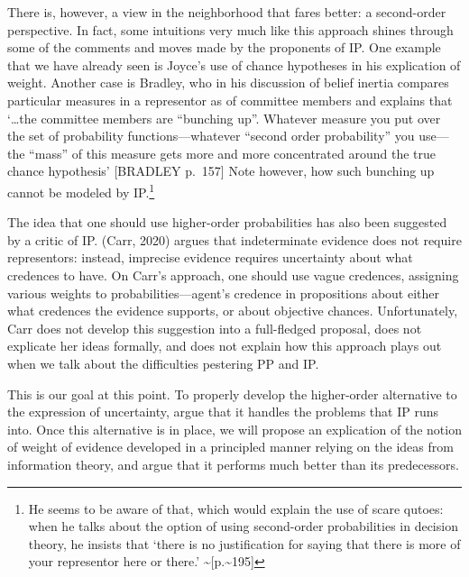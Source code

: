 \documentclass[
  10pt,
  dvipsnames,enabledeprecatedfontcommands]{scrartcl}
\begin{document}
There is, however, a view in the neighborhood that fares better: a
second-order perspective. In fact, some intuitions very much like this
approach shines through some of the comments and moves made by the
proponents of \textsf{IP}. One example that we have already seen is
Joyce's use of chance hypotheses in his explication of weight. Another
case is Bradley, who in his discussion of belief inertia compares
particular measures in a representor as of committee members and
explains that `\dots the committee members are ``bunching up''. Whatever
measure you put over the set of probability functions---whatever
``second order probability'' you use---the ``mass'' of this measure gets
more and more concentrated around the true chance hypothesis' {[}BRADLEY
p.~157{]} Note however, how such bunching up cannot be modeled by
\textsf{IP}.\footnote{He seems to be aware of that, which would explain
  the use of scare qutoes: when he talks about the option of using
  second-order probabilities in decision theory, he insists that `there
  is no justification for saying that there is more of your representor
  here or there.' \textasciitilde{[}p.\textasciitilde195{]}}

The idea that one should use higher-order probabilities has also been
suggested by a critic of \textsf{IP}. (Carr, 2020) argues that
indeterminate evidence does not require representors: instead, imprecise
evidence requires uncertainty about what credences to have. On Carr's
approach, one should use vague credences, assigning various weights to
probabilities---agent's credence in propositions about either what
credences the evidence supports, or about objective chances.
Unfortunately, Carr does not develop this suggestion into a full-fledged
proposal, does not explicate her ideas formally, and does not explain
how this approach plays out when we talk about the difficulties
pestering \textsf{PP} and \textsf{IP}.

This is our goal at this point. To properly develop the higher-order
alternative to the expression of uncertainty, argue that it handles the
problems that \textsf{IP} runs into. Once this alternative is in place,
we will propose an explication of the notion of weight of evidence
developed in a principled manner relying on the ideas from information
theory, and argue that it performs much better than its predecessors.
\end{document}
